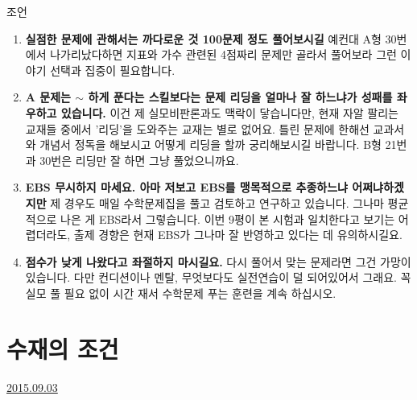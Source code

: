 조언
\vspace{5mm}

\begin{enumerate}
    \item \textbf{실점한 문제에 관해서는 까다로운 것 100문제 정도 풀어보시길}
    예컨대 A형 30번에서 나가리났다하면 지표와 가수 관련된 4점짜리 문제만 골라서 풀어보라 그런 이야기
    선택과 집중이 필요합니다.
    \vspace{5mm}
    
    \item \textbf{A 문제는 $\sim$ 하게 푼다는 스킬보다는 문제 리딩을 얼마나 잘 하느냐가 성패를 좌우하고 있습니다.}
    이건 제 실모비판론과도 맥락이 닿습니다만, 현재 자알 팔리는 교재들 중에서 '리딩'을 도와주는 교재는 별로 없어요.
    틀린 문제에 한해선 교과서와 개념서 정독을 해보시고 어떻게 리딩을 할까 궁리해보시길 바랍니다.
    B형 21번과 30번은 리딩만 잘 하면 그냥 풀었으니까요.
    \vspace{5mm}
    
    \item \textbf{EBS 무시하지 마세요. 아마 저보고 EBS를 맹목적으로 추종하느냐 어쩌냐하겠지만}
    제 경우도 매일 수학문제집을 풀고 검토하고 연구하고 있습니다. 그나마 평균적으로 나은 게 EBS라서 그렇습니다.
    이번 9평이 본 시험과 일치한다고 보기는 어렵더라도, 출제 경향은 현재 EBS가 그나마 잘 반영하고 있다는 데 유의하시길요.
    \vspace{5mm}
    
    \item \textbf{점수가 낮게 나왔다고 좌절하지 마시길요.}
    다시 풀어서 맞는 문제라면 그건 가망이 있습니다. 다만 컨디션이나 멘탈, 무엇보다도 실전연습이 덜 되어있어서 그래요.
    꼭 실모 풀 필요 없이 시간 재서 수학문제 푸는 훈련을 계속 하십시오.
    \vspace{5mm}
    
\end{enumerate}
    
    


\section{수재의 조건}
\href{https://www.kockoc.com/Apoc/287758}{2015.09.03}

